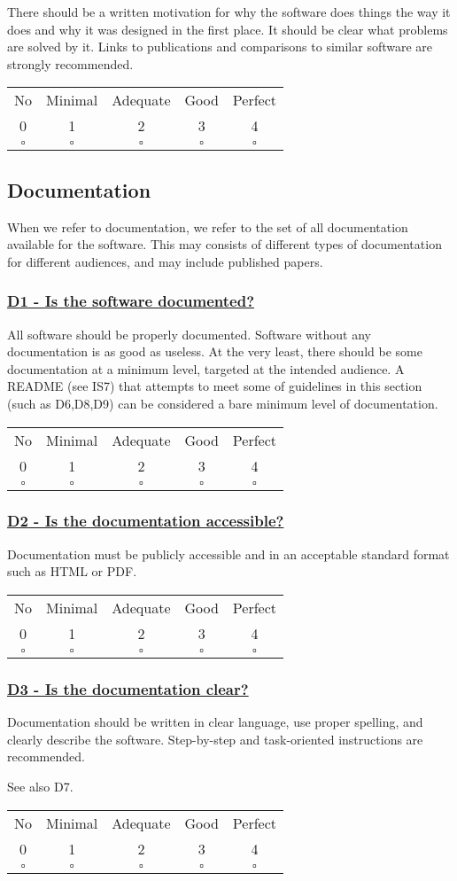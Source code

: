 \documentclass[a4paper,11pt]{article}
\newcommand{\criterion}[2]{\subsubsection*{\underline{#1 - #2}}\label{id:#1}}
\newcommand\CheckTable{%
  \begin{tabular}{ccccc}
    No & Minimal & Adequate & Good & Perfect \\
    0 & 1 & 2 & 3 & 4 \\
    \hline
    $\square$ & $\square$ & $\square$ & $\square$ & $\square$ \\
  \end{tabular}%
}
\begin{document}
There should be a written motivation for why the software does things the way
it does and why it was designed in the first place. It should be clear what
problems are solved by it. Links to publications and comparisons to similar
software are strongly recommended.

\CheckTable

\subsection{Documentation}\label{sec:doc}

When we refer to documentation, we refer to the set of all documentation
available for the software. This may consists of different types of
documentation for different audiences, and may include published papers.

\newcommand{\dOneID}{D1}
\newcommand{\dOneText}{Is the software documented?}
\criterion{\dOneID}{\dOneText}

All software should be properly documented. Software without any documentation
is as good as useless. At the very least, there should be some documentation at
a minimum level, targeted at the intended audience. A README (see IS7) that
attempts to meet some of guidelines in this section (such as D6,D8,D9) can be
considered a bare minimum level of documentation.

\CheckTable

%
%
%

\newcommand{\dTwoID}{D2}
\newcommand{\dTwoText}{Is the documentation accessible?}
\criterion{\dTwoID}{\dTwoText}

Documentation must be publicly accessible and in an acceptable standard format
such as HTML or PDF.

\CheckTable

\newcommand{\dThreeID}{D3}
\newcommand{\dThreeText}{Is the documentation clear?}
\criterion{\dThreeID}{\dThreeText}

Documentation should be written in clear language, use proper spelling, and
clearly describe the software. Step-by-step and task-oriented instructions are
recommended.

See also D7.

\CheckTable
\end{document}
